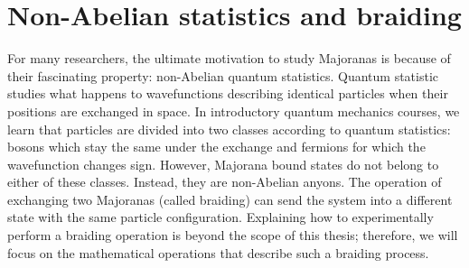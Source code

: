 

\section{Non-Abelian statistics and braiding}\label{sec:braiding}
For many researchers, the ultimate motivation to study Majoranas is because of their fascinating property: non-Abelian quantum statistics.
Quantum statistic studies what happens to wavefunctions describing identical particles when their positions are exchanged in space.
In introductory quantum mechanics courses, we learn that particles are divided into two classes according to quantum statistics: bosons which stay the same under the exchange and fermions for which the wavefunction changes sign.
However, Majorana bound states do not belong to either of these classes.
Instead, they are non-Abelian anyons.
The operation of exchanging two Majoranas (called braiding) can send the system into a different state with the same particle configuration.
Explaining how to experimentally perform a braiding operation is beyond the scope of this thesis; therefore, we will focus on the mathematical operations that describe such a braiding process.

